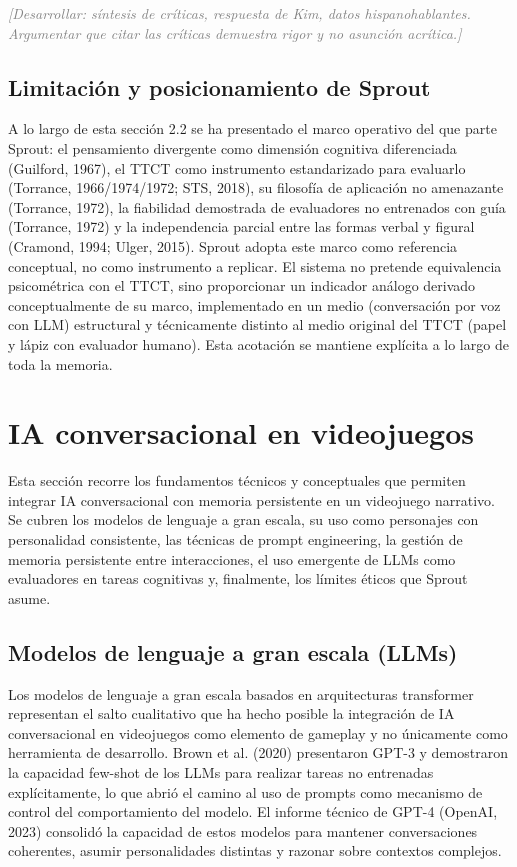 \documentclass[12pt,twoside,titlepage]{report}
\begin{document}
\textcolor{gray}{\textit{[Desarrollar: síntesis de críticas, respuesta de Kim, datos hispanohablantes. Argumentar que citar las críticas demuestra rigor y no asunción acrítica.]}}

\subsection{Limitación y posicionamiento de Sprout}

A lo largo de esta sección 2.2 se ha presentado el marco operativo del que parte Sprout: el pensamiento divergente como dimensión cognitiva diferenciada (Guilford, 1967), el TTCT como instrumento estandarizado para evaluarlo (Torrance, 1966/1974/1972; STS, 2018), su filosofía de aplicación no amenazante (Torrance, 1972), la fiabilidad demostrada de evaluadores no entrenados con guía (Torrance, 1972) y la independencia parcial entre las formas verbal y figural (Cramond, 1994; Ulger, 2015). Sprout adopta este marco como referencia conceptual, no como instrumento a replicar. El sistema no pretende equivalencia psicométrica con el TTCT, sino proporcionar un indicador análogo derivado conceptualmente de su marco, implementado en un medio (conversación por voz con LLM) estructural y técnicamente distinto al medio original del TTCT (papel y lápiz con evaluador humano). Esta acotación se mantiene explícita a lo largo de toda la memoria.

\section{IA conversacional en videojuegos}

Esta sección recorre los fundamentos técnicos y conceptuales que permiten integrar IA conversacional con memoria persistente en un videojuego narrativo. Se cubren los modelos de lenguaje a gran escala, su uso como personajes con personalidad consistente, las técnicas de prompt engineering, la gestión de memoria persistente entre interacciones, el uso emergente de LLMs como evaluadores en tareas cognitivas y, finalmente, los límites éticos que Sprout asume.

\subsection{Modelos de lenguaje a gran escala (LLMs)}

Los modelos de lenguaje a gran escala basados en arquitecturas transformer representan el salto cualitativo que ha hecho posible la integración de IA conversacional en videojuegos como elemento de gameplay y no únicamente como herramienta de desarrollo. Brown et al. (2020) presentaron GPT-3 y demostraron la capacidad few-shot de los LLMs para realizar tareas no entrenadas explícitamente, lo que abrió el camino al uso de prompts como mecanismo de control del comportamiento del modelo. El informe técnico de GPT-4 (OpenAI, 2023) consolidó la capacidad de estos modelos para mantener conversaciones coherentes, asumir personalidades distintas y razonar sobre contextos complejos.
\end{document}
